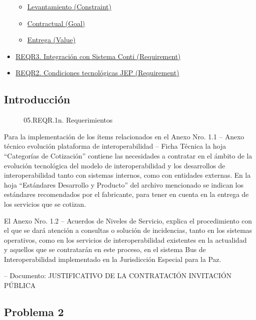 \documentclass[
  paper=a4,
  ,captions=tableheading
]{scrartcl}
\providecommand{\tightlist}{%
  \setlength{\itemsep}{0pt}\setlength{\parskip}{0pt}}
\begin{document}
\begin{itemize}
  \begin{itemize}
  \tightlist
  \item
    \protect\hyperlink{levantamiento-constraint}{Levantamiento
    (Constraint)}
  \item
    \protect\hyperlink{contractual-goal}{Contractual (Goal)}
  \item
    \protect\hyperlink{entrega-value}{Entrega (Value)}
  \end{itemize}
\item
  \protect\hyperlink{reqr3.-integraciuxf3n-con-sistema-conti-requirement}{REQR3.
  Integración con Sistema Conti (Requirement)}
\item
  \protect\hyperlink{reqr2.-condiciones-tecnoluxf3gicas-jep-requirement}{REQR2.
  Condiciones tecnológicas JEP (Requirement)}
\end{itemize}

\hypertarget{introducciuxf3n}{%
\subsection{Introducción}\label{introducciuxf3n}}

\begin{figure}
\centering
\caption{05.REQR.1n. Requerimientos}
\end{figure}

Para la implementación de los ítems relacionados en el Anexo Nro. 1.1 --
Anexo técnico evolución plataforma de interoperabilidad -- Ficha Técnica
la hoja ``Categorías de Cotización'' contiene las necesidades a
contratar en el ámbito de la evolución tecnológica del modelo de
interoperabilidad y los desarrollos de interoperabilidad tanto con
sistemas internos, como con entidades externas. En la hoja ``Estándares
Desarrollo y Producto'' del archivo mencionado se indican los estándares
recomendados por el fabricante, para tener en cuenta en la entrega de
los servicios que se cotizan.

El Anexo Nro. 1.2 -- Acuerdos de Niveles de Servicio, explica el
procedimiento con el que se dará atención a consultas o solución de
incidencias, tanto en los sistemas operativos, como en los servicios de
interoperabilidad existentes en la actualidad y aquellos que se
contratarán en este proceso, en el sistema Bus de Interoperabilidad
implementado en la Jurisdicción Especial para la Paz.

-- Documento: JUSTIFICATIVO DE LA CONTRATACIÓN INVITACIÓN PÚBLICA

\hypertarget{problema-2}{%
\subsection{Problema 2}\label{problema-2}}
\end{document}
